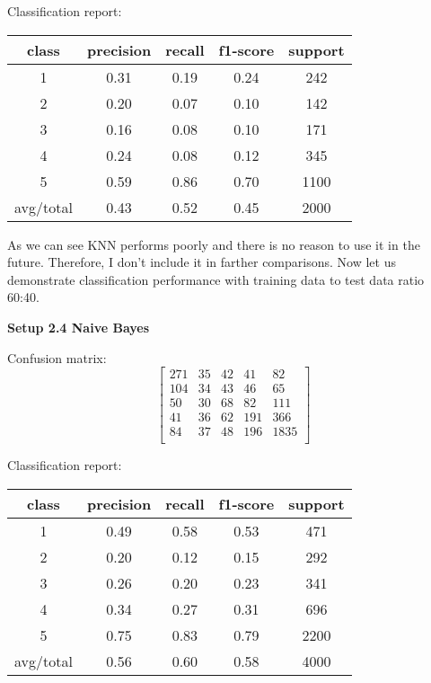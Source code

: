 \documentclass[12pt]{report}
\begin{document}
Classification report:

\begin{center}
	\begin{tabular}{c | c | c | c | c }
		\hline
		class & precision & recall & f1-score & support \\ \hline
		1 & 0.31 & 0.19 & 0.24 & 242 \\ \hline
		2 & 0.20 & 0.07 & 0.10 & 142 \\ \hline
		3 & 0.16 & 0.08 & 0.10 & 171 \\ \hline
		4 & 0.24 & 0.08 & 0.12 & 345 \\ \hline
		5 & 0.59 & 0.86 & 0.70 & 1100 \\ \hline
		avg/total & 0.43 & 0.52 & 0.45 & 2000 \\ \hline
	\end{tabular}
\end{center}

As we can see KNN performs poorly and there is no reason to use it in the future. Therefore, I don't include it in farther comparisons. Now let us demonstrate classification performance with training data to test data ratio 60:40.

\bigbreak

\textbf{Setup 2.4 Naive Bayes}

Confusion matrix:
\[
\begin{bmatrix}
271 & 35 &  42 & 41 & 82 \\
104 & 34 & 43 & 46 & 65 \\
50 & 30 & 68 & 82 & 111 \\
41 & 36 & 62 & 191 & 366 \\
84 & 37 & 48 & 196 & 1835 \\
\end{bmatrix}
\]

Classification report:

\begin{center}
	\begin{tabular}{c | c | c | c | c }
		\hline
		class & precision & recall & f1-score & support \\ \hline
		1 & 0.49 & 0.58 & 0.53 & 471 \\ \hline
		2 & 0.20 & 0.12 & 0.15 & 292 \\ \hline
		3 & 0.26 & 0.20 & 0.23 & 341 \\ \hline
		4 & 0.34 & 0.27 & 0.31 & 696 \\ \hline
		5 & 0.75 & 0.83 & 0.79 & 2200 \\ \hline
		avg/total & 0.56 & 0.60 & 0.58 & 4000 \\ \hline
	\end{tabular}
\end{center}
\end{document}

